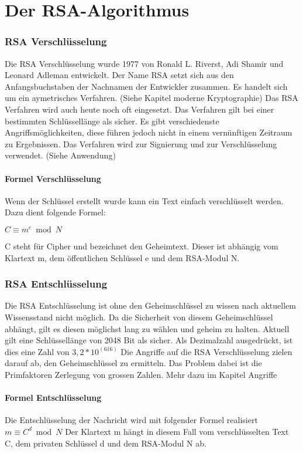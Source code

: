 \part{Der RSA-Algorithmus}



\section{RSA Verschlüsselung}
Die RSA Verschlüsselung wurde 1977 von Ronald L. Riverst, Adi Shamir und Leonard Adleman entwickelt. Der Name RSA setzt sich aus den Anfangsbuchstaben der Nachnamen der Entwickler zusammen. Es handelt sich um ein aymetrisches Verfahren. (Siehe Kapitel moderne Kryptographie) %
Das RSA Verfahren wird auch heute noch oft eingesetzt. Das Verfahren gilt bei einer bestimmten Schlüssellänge als sicher. Es gibt verschiedenste Angriffsmöglichkeiten, diese führen jedoch nicht in einem vernünftigen Zeitraum zu Ergebnissen. Das Verfahren wird zur Signierung und zur Verschlüsselung verwendet. (Siehe Anwendung) %

\subsection{Formel Verschlüsselung}
Wenn der Schlüssel erstellt wurde kann ein Text einfach verschlüsselt werden. Dazu dient folgende Formel:

$ C \equiv m^e  \bmod N $

C steht für Cipher und bezeichnet den Geheimtext. Dieser ist abhängig vom Klartext m, dem öffentlichen Schlüssel e und dem RSA-Modul N. 

\section{RSA Entschlüsselung}
Die RSA Entschlüsselung ist ohne den Geheimschlüssel zu wissen nach aktuellem Wissensstand nicht möglich. Da die Sicherheit von diesem Geheimschlüssel abhängt, gilt es diesen möglichst lang zu wählen und geheim zu halten. Aktuell gilt eine Schlüssellänge von 2048 Bit als sicher. Als Dezimalzahl ausgedrückt, ist dies eine Zahl von $ 3,2 * 10^(616) $
Die Angriffe auf die RSA Verschlüsselung zielen darauf ab, den Geheimschlüssel zu ermitteln. Das Problem dabei ist die Primfaktoren Zerlegung von grossen Zahlen. Mehr dazu im Kapitel Angriffe %

\subsection{Formel Entschlüsselung}
Die Entschlüsselung der Nachricht wird mit folgender Formel realisiert
%
$ m \equiv C^d \bmod N $
%
Der Klartext m hängt in diesem Fall vom verschlüsselten Text C, dem privaten Schlüssel d und dem RSA-Modul N ab. 
%
